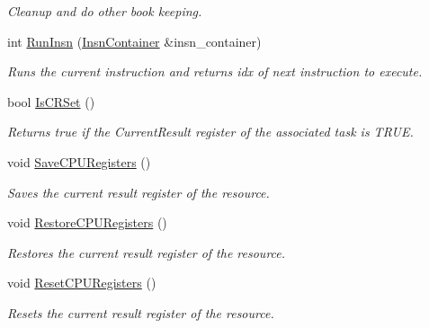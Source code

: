 \begin{DoxyCompactItemize}
\begin{DoxyCompactList}\small\item\em Cleanup and do other book keeping. \end{DoxyCompactList}\item 
int \hyperlink{classpc__emulator_1_1Executor_abf2af6604c54863a1a67a36a2526e357}{Run\+Insn} (\hyperlink{classpc__emulator_1_1InsnContainer}{Insn\+Container} \&insn\+\_\+container)
\begin{DoxyCompactList}\small\item\em Runs the current instruction and returns idx of next instruction to execute. \end{DoxyCompactList}\item 
bool \hyperlink{classpc__emulator_1_1Executor_a5c6ca0fb0177b7010f16bdebac11c713}{Is\+C\+R\+Set} ()\hypertarget{classpc__emulator_1_1Executor_a5c6ca0fb0177b7010f16bdebac11c713}{}\label{classpc__emulator_1_1Executor_a5c6ca0fb0177b7010f16bdebac11c713}

\begin{DoxyCompactList}\small\item\em Returns true if the Current\+Result register of the associated task is T\+R\+UE. \end{DoxyCompactList}\item 
void \hyperlink{classpc__emulator_1_1Executor_ad1bfe0eefa104d73193b062270e83008}{Save\+C\+P\+U\+Registers} ()\hypertarget{classpc__emulator_1_1Executor_ad1bfe0eefa104d73193b062270e83008}{}\label{classpc__emulator_1_1Executor_ad1bfe0eefa104d73193b062270e83008}

\begin{DoxyCompactList}\small\item\em Saves the current result register of the resource. \end{DoxyCompactList}\item 
void \hyperlink{classpc__emulator_1_1Executor_af20b7d1a162e6b974ff228c51ea86d92}{Restore\+C\+P\+U\+Registers} ()\hypertarget{classpc__emulator_1_1Executor_af20b7d1a162e6b974ff228c51ea86d92}{}\label{classpc__emulator_1_1Executor_af20b7d1a162e6b974ff228c51ea86d92}

\begin{DoxyCompactList}\small\item\em Restores the current result register of the resource. \end{DoxyCompactList}\item 
void \hyperlink{classpc__emulator_1_1Executor_ae735d64520122eff70a5f539375027e6}{Reset\+C\+P\+U\+Registers} ()\hypertarget{classpc__emulator_1_1Executor_ae735d64520122eff70a5f539375027e6}{}\label{classpc__emulator_1_1Executor_ae735d64520122eff70a5f539375027e6}

\begin{DoxyCompactList}\small\item\em Resets the current result register of the resource. \end{DoxyCompactList}\end{DoxyCompactItemize}
